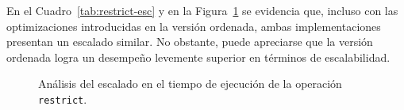 \begin{itemize}
    En el Cuadro~\ref{tab:restrict-esc} y en la Figura~\ref{fig:restrict-esc} 
    se evidencia que, incluso con las optimizaciones introducidas en la versión ordenada, ambas implementaciones presentan un escalado similar. No obstante, puede apreciarse que la versión ordenada logra un desempeño levemente superior en términos de escalabilidad.



    \begin{table}[ht]
    \centering
    \caption{Cuadro de escalado del tiempo de ejecución de la operación \texttt{restrict}}
    \label{tab:restrict-esc}
    \end{table}

    \begin{figure}[htbp]
          \centering
          \caption{Análisis del escalado en el tiempo de ejecución de la operación \texttt{restrict}.}
          \label{fig:restrict-esc}
    \end{figure}



\end{itemize}
